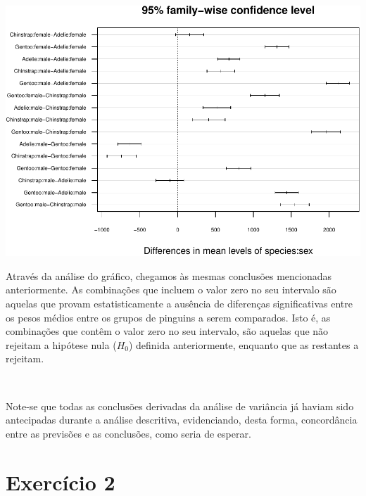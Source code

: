 \documentclass[]{article}
\begin{document}
\begin{Shaded}
\begin{Highlighting}[]
\NormalTok{(} \NormalTok{(}\NormalTok{, }\NormalTok{, }\NormalTok{, }\NormalTok{))}
\NormalTok{(}\NormalTok{), } \NormalTok{, } \NormalTok{)}
\end{Highlighting}
\end{Shaded}

\includegraphics{AEII_main_files/figure-latex/unnamed-chunk-19-1.pdf}

Através da análise do gráfico, chegamos às mesmas conclusões mencionadas
anteriormente. As combinações que incluem o valor zero no seu intervalo
são aquelas que provam estatisticamente a ausência de diferenças
significativas entre os pesos médios entre os grupos de pinguins a serem
comparados. Isto é, as combinações que contêm o valor zero no seu
intervalo, são aquelas que não rejeitam a hipótese nula (\(H_0\))
definida anteriormente, enquanto que as restantes a rejeitam.

\(\ \)

Note-se que todas as conclusões derivadas da análise de variância já
haviam sido antecipadas durante a análise descritiva, evidenciando,
desta forma, concordância entre as previsões e as conclusões, como seria
de esperar.

\newpage
\section{Exercício 2}
\end{document}
